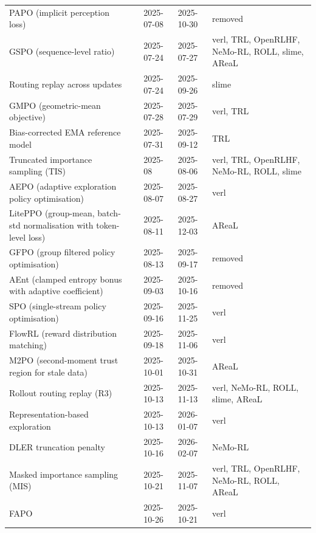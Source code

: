 \begin{longtable}{@{}>{\raggedright\arraybackslash}p{3.5cm} >{\raggedright\arraybackslash}p{2.3cm} l l >{\raggedright\arraybackslash}p{2.9cm}@{}}
PAPO (implicit perception loss) & \citet{arxiv250706448} & 2025-07-08 & 2025-10-30 & removed \\
GSPO (sequence-level ratio) & \citet{arxiv250718071} & 2025-07-24 & 2025-07-27 & verl, TRL, OpenRLHF, NeMo-RL, ROLL, slime, AReaL \\
Routing replay across updates & \citet{arxiv250718071} & 2025-07-24 & 2025-09-26 & slime \\
GMPO (geometric-mean objective) & \citet{arxiv250720673} & 2025-07-28 & 2025-07-29 & verl, TRL \\
Bias-corrected EMA reference model & \citet{arxiv250800180} & 2025-07-31 & 2025-09-12 & TRL \\
Truncated importance sampling (TIS) & \citet{yao2025tis} & 2025-08 & 2025-08-06 & verl, TRL, OpenRLHF, NeMo-RL, ROLL, slime \\
AEPO (adaptive exploration policy optimisation) & \citet{arxiv250805731} & 2025-08-07 & 2025-08-27 & verl \\
LitePPO (group-mean, batch-std normalisation with token-level loss) & \citet{arxiv250808221} & 2025-08-11 & 2025-12-03 & AReaL \\
GFPO (group filtered policy optimisation) & \citet{arxiv250809726} & 2025-08-13 & 2025-09-17 & removed \\
AEnt (clamped entropy bonus with adaptive coefficient) & \citet{arxiv250903493} & 2025-09-03 & 2025-10-16 & removed \\
SPO (single-stream policy optimisation) & \citet{arxiv250913232} & 2025-09-16 & 2025-11-25 & verl \\
FlowRL (reward distribution matching) & \citet{arxiv250915207} & 2025-09-18 & 2025-11-06 & verl \\
M2PO (second-moment trust region for stale data) & \citet{arxiv251001161} & 2025-10-01 & 2025-10-31 & AReaL \\
Rollout routing replay (R3) & \citet{arxiv251011370} & 2025-10-13 & 2025-11-13 & verl, NeMo-RL, ROLL, slime, AReaL \\
Representation-based exploration & \citet{arxiv251011686} & 2025-10-13 & 2026-01-07 & verl \\
DLER truncation penalty & \citet{arxiv251015110} & 2025-10-16 & 2026-02-07 & NeMo-RL \\
Masked importance sampling (MIS) & \citet{arxiv251018855} & 2025-10-21 & 2025-11-07 & verl, TRL, OpenRLHF, NeMo-RL, ROLL, AReaL \\
FAPO & \citet{arxiv251022543} & 2025-10-26 & 2025-10-21 & verl \\

\end{longtable}

